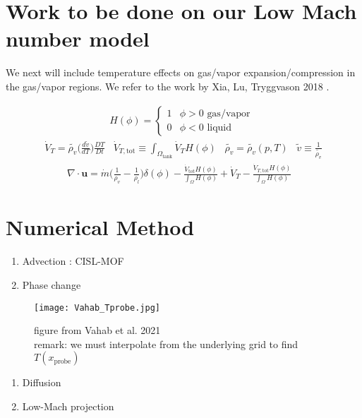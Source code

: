 \documentclass[]{article}
\begin{document}
\section*{Work to be done on our Low Mach number model} 
We next will include temperature effects on gas/vapor expansion/compression
in the gas/vapor regions.  We refer to the work by 
Xia, Lu, Tryggvason 2018 \cite{XiaLuTryggvason2018}.
\begin{mymathbox}[title=volume change due to temperature, colframe=blue!50!black]
\begin{eqnarray*}
H(\phi)=\left\{ \begin{array}{cc}
  1 & \phi>0 \mbox{ gas/vapor } \\
  0 & \phi<0 \mbox{ liquid }
 \end{array} \right.
\end{eqnarray*}
\begin{eqnarray*}
\dot{V}_T = \tilde{\rho_{v}}\big(\frac{d\tilde{v}}{dT}\big)\frac{DT}{Dt}
\hspace{10pt} 
\displaystyle \dot{V}_{T,\textrm{tot}} \equiv 
\int_{\Omega_{\textrm{tank}}} 
\dot{V}_T H(\phi)
\hspace{10pt} 
\tilde{\rho_{v}}=\tilde{\rho_{v}}(p,T) 
\hspace{10pt} 
\tilde{v}\equiv\frac{1}{\tilde{\rho_{v}}}
\end{eqnarray*}
\begin{eqnarray*}
\nabla \cdot \bm{u} =
\dot{m}\bigg(\frac{1}{\rho_v}-\frac{1}{\rho_l}\bigg)\delta(\phi) - 
\frac{\dot{V}_{\textrm{tot}} H(\phi)}{\int_{\Omega}H(\phi)}+\dot{V}_T-
\frac{\dot{V}_{T,\textrm{tot}} H(\phi)}{\int_{\Omega}H(\phi)} \hspace{10pt}
\end{eqnarray*}
\end{mymathbox}

\section*{Numerical Method} 
\begin{enumerate}
\item Advection : CISL-MOF \cite{VAHAB2021}\cite{WEYMOUTH2010}
\item Phase change \cite{VAHAB2021}
\setcounter{stepcount}{\value{enumi}}
\end{enumerate}
\begin{figure}[h]
\centering
\texttt{[image: Vahab\_Tprobe.jpg]}
\vspace{-1em}
\caption*{\small figure from Vahab et al. 2021 \cite{VAHAB2021}\\ remark: we must interpolate from the underlying grid to find $T(x_{\textrm{probe}})$}
\end{figure}
\vspace{-1em}
\begin{enumerate}
\setcounter{enumi}{\value{stepcount}}
\item Diffusion
\item Low-Mach projection \cite{Pei2019}\cite{VAHAB2021}
\end{enumerate}
\end{document}
